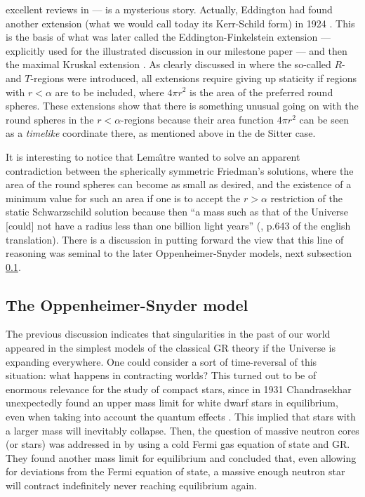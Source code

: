 \documentclass[12pt]{iopart}
\begin{document}
excellent reviews in \cite{TCE,I}--- is a mysterious story. Actually,  Eddington had found another extension (what we would call today its Kerr-Schild form) in 1924 \cite{Edd}. This is the basis of what was later called the Eddington-Finkelstein extension \cite{Fin} ---explicitly used for the illustrated discussion in our milestone paper \cite{P}--- and then the maximal Kruskal extension \cite{Kru}. As clearly discussed in \cite{Nov} where the so-called $R$-and $T$-regions were introduced, all extensions require giving up staticity if regions with $r<\alpha$ are to be included, where $4\pi r^2$ is the area of the preferred round spheres. These extensions show that there is something unusual going on with the round spheres in the $r<\alpha$-regions because their area function $4\pi r^2$ can be seen as a {\it timelike} coordinate there, as mentioned above in the de Sitter case.

It is interesting to notice that Lema\^{\i}tre wanted to solve an apparent
contradiction between the spherically symmetric Friedman's solutions, where the area of the round spheres 
can become as small as desired, and the existence of a minimum value for such an
area if one is to accept the $r>\alpha$ restriction of the static Schwarzschild solution because then ``a mass such as that of the Universe [could] not have a radius less than one billion light years'' (\cite{L}, p.643 of the english translation).
There is a discussion in \cite{E93} putting forward the view that this line
of reasoning was seminal to the later Oppenheimer-Snyder models, next subsection \ref{subsec:OS}.



\subsection{The Oppenheimer-Snyder model}\label{subsec:OS}
The previous discussion indicates that singularities in the past of our world appeared in the simplest models of the classical GR theory if the Universe is expanding everywhere. One could consider a sort of time-reversal of this situation: what happens in contracting worlds? This turned out to be of enormous relevance for the study of compact stars, since in 1931 Chandrasekhar unexpectedly found an upper mass limit for white dwarf stars in 
equilibrium, even when taking into account the quantum effects \cite{Chandra}. This implied that
stars with a larger mass will inevitably collapse. Then, the question of massive neutron cores (or stars) was addressed in \cite{OV} by using a cold Fermi gas equation of state and GR. They found another mass limit for equilibrium and concluded that, even allowing for deviations from the Fermi equation of state, a massive enough neutron star will contract indefinitely never reaching equilibrium again. 
\end{document}
